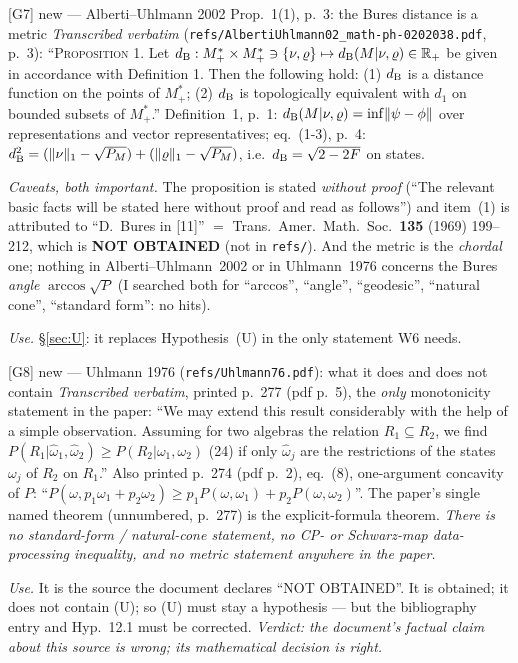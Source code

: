 \documentclass[11pt]{article}
\theoremstyle{definition}\newtheorem{example}[theorem]{Example}
\begin{document}
\begin{citedbox}{[G7] new --- Alberti--Uhlmann 2002 Prop.~1(1), p.~3: the Bures distance is
a metric}
\emph{Transcribed verbatim} (\texttt{refs/AlbertiUhlmann02\_math-ph-0202038.pdf}, p.~3):
``\textsc{Proposition 1}.  Let $d_{\rm B}:M^*_+\times M^*_+\ni\{\nu,\varrho\}\mapsto
d_{\rm B}(M|\nu,\varrho)\in\mathbb R_+$ be given in accordance with Definition 1.  Then
the following hold: (1) $d_{\rm B}$ is a distance function on the points of $M^*_+$; (2)
$d_{\rm B}$ is topologically equivalent with $d_1$ on bounded subsets of $M^*_+$.''
Definition~1, p.~1: $d_{\rm B}(M|\nu,\varrho)=\inf\lVert\psi-\phi\rVert$ over
representations and vector representatives; eq.~(1-3), p.~4:
$d_{\rm B}^2=(\lVert\nu\rVert_1-\sqrt{P_M})+(\lVert\varrho\rVert_1-\sqrt{P_M})$, i.e.\
$d_{\rm B}=\sqrt{2-2F}$ on states.

\emph{Caveats, both important.}  The proposition is stated \emph{without proof} (``The
relevant basic facts will be stated here without proof and read as follows'') and item~(1)
is attributed to ``D.~Bures in [11]'' $=$ Trans.\ Amer.\ Math.\ Soc.\ \textbf{135} (1969)
199--212, which is \textbf{NOT OBTAINED} (not in \texttt{refs/}).  And the metric is the
\emph{chordal} one; nothing in Alberti--Uhlmann~2002 or in Uhlmann~1976 concerns the
Bures \emph{angle} $\arccos\sqrt{P}$ (I searched both for ``arccos'', ``angle'',
``geodesic'', ``natural cone'', ``standard form'': no hits).

\emph{Use.}  \S\ref{sec:U}: it replaces Hypothesis~(U) in the only statement W6 needs.

\smallskip\noindent{}
\end{citedbox}

\begin{citedbox}{[G8] new --- Uhlmann 1976 (\texttt{refs/Uhlmann76.pdf}): what it does and
does not contain}
\emph{Transcribed verbatim}, printed p.~277 (pdf p.~5), the \emph{only} monotonicity
statement in the paper:
``We may extend this result considerably with the help of a simple observation.  Assuming
for two algebras the relation $R_1\subseteq R_2$, we find
$P(R_1|\hat\omega_1,\hat\omega_2)\ge P(R_2|\omega_1,\omega_2)$ \hfill (24)
if only $\hat\omega_j$ are the restrictions of the states $\omega_j$ of $R_2$ on $R_1$.''
Also printed p.~274 (pdf p.~2), eq.~(8), one-argument concavity of $P$:
``$P(\omega,p_1\omega_1+p_2\omega_2)\ge p_1P(\omega,\omega_1)+p_2P(\omega,\omega_2)$''.
The paper's single named theorem (unnumbered, p.~277) is the explicit-formula theorem.
\emph{There is no standard-form / natural-cone statement, no CP- or Schwarz-map
data-processing inequality, and no metric statement anywhere in the paper.}

\emph{Use.}  It is the source the document declares ``NOT OBTAINED''.  It is obtained; it
does not contain (U); so (U) must stay a hypothesis --- but the bibliography entry and
Hyp.~12.1 must be corrected.  \emph{Verdict: the document's factual claim about this
source is wrong; its mathematical decision is right.}

\smallskip\noindent{}
\end{citedbox}
\end{document}
